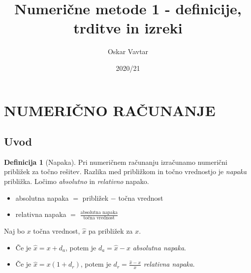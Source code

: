 \documentclass[11pt]{article}
\title{Numerične metode 1 - definicije, trditve in izreki}
\author{Oskar Vavtar}
\date{2020/21}
\theoremstyle{definition}
\newtheorem{definicija}{Definicija}[section]
\begin{document}
\maketitle
\pagebreak
\tableofcontents
\pagebreak


\section{NUMERIČNO RAČUNANJE}
\vspace{0.5cm}


\subsection{Uvod}
\vspace{0.5cm}

\begin{definicija}[Napaka]

Pri numeričnem računanju izračunamo numerični približek za točno rešitev. Razlika med približkom in točno vrednostjo je \textit{napaka} približka. Ločimo \textit{absolutno} in \textit{relativno} napako.

\begin{itemize}
	\item absolutna napaka $=$ približek $-$ točna vrednost
	\item relativna napaka $=$ $\frac{\text{absolutna napaka}}{\text{točna vrednost}}$
\end{itemize}

Naj bo $x$ točna vrednost, $\hat{x}$ pa približek za $x$.

\begin{itemize}
	\item Če je $\hat{x} = x + d_a$, potem je $d_a = \hat{x} - x$ \textit{absolutna napaka}.
	\item Če je $\hat{x} = x(1 + d_r)$, potem je $d_r = \frac{\hat{x} - x}{x}$ \textit{relativna napaka}.
\end{itemize}

\end{definicija}
\vspace{0.5cm}

\end{document}
